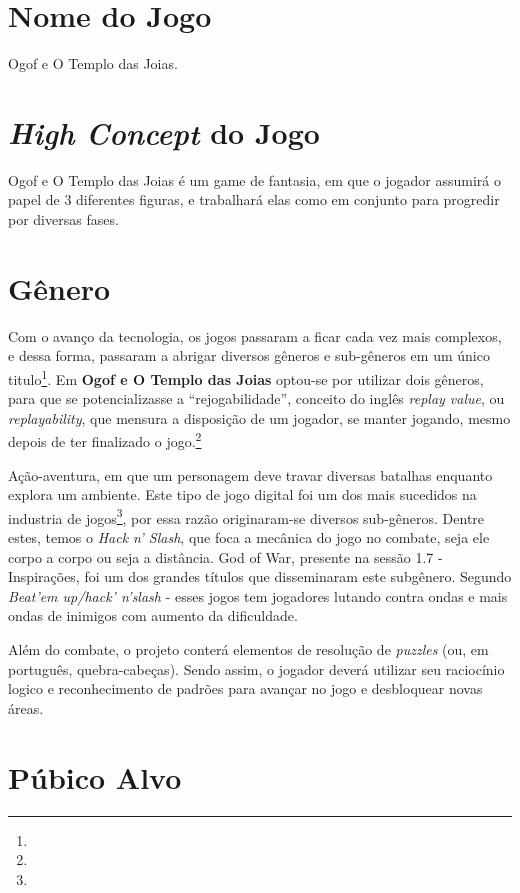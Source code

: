 \section{Nome do Jogo} Ogof e O Templo das Joias.

\section{\textit{High Concept} do Jogo} Ogof e O Templo das Joias é um game de
fantasia, em que o jogador assumirá o papel de 3 diferentes figuras, e trabalhará elas como
em conjunto para progredir por diversas fases.

\section{Gênero}
Com o avanço da tecnologia, os jogos passaram a ficar cada vez mais complexos, e dessa forma, passaram a abrigar diversos gêneros e sub-gêneros em um único titulo\footnote{}. Em \textbf{Ogof e O Templo das Joias} optou-se por utilizar dois gêneros, para que se potencializasse a ``rejogabilidade'', conceito do inglês \textit{replay value}, ou \textit{replayability}, que mensura a disposição de um jogador, se manter jogando, mesmo depois de ter finalizado o jogo.\footnote{}

Ação-aventura, em que um personagem deve travar diversas batalhas enquanto explora um ambiente. Este tipo de jogo digital foi um dos mais sucedidos na industria de jogos\footnote{}, por essa razão originaram-se diversos sub-gêneros. Dentre estes, temos o \textit{Hack n' Slash}, que foca a mecânica do jogo no combate, seja ele corpo a corpo ou seja a distância. God of War, presente  na sessão 1.7 - Inspirações, foi um dos grandes títulos que disseminaram este subgênero. Segundo  \textit{Beat'em up/hack' n'slash} - esses jogos tem jogadores lutando contra ondas e mais ondas de inimigos com aumento da dificuldade.

Além do combate, o projeto conterá elementos de resolução de \textit{puzzles} (ou, em português, quebra-cabeças). Sendo assim, o jogador deverá utilizar seu raciocínio logico e reconhecimento de padrões para avançar no jogo e desbloquear novas áreas.

\section{Púbico Alvo}


